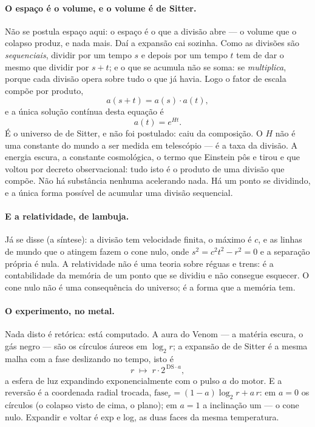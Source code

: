 \documentclass[11pt]{article}
\theoremstyle{plain}
\theoremstyle{remark}
\begin{document}
\paragraph{O espaço é o volume, e o volume é de Sitter.} Não se postula espaço aqui:
o espaço é o que a divisão abre --- o volume que o colapso produz, e nada mais. Daí a
expansão cai sozinha. Como as divisões são \emph{sequenciais}, dividir por um tempo
$s$ e depois por um tempo $t$ tem de dar o mesmo que dividir por $s+t$; e o que se
acumula não se soma: se \emph{multiplica}, porque cada divisão opera sobre tudo o que
já havia. Logo o fator de escala compõe por produto,
\[
a(s+t)=a(s)\cdot a(t),
\]
e a única solução contínua desta equação é
\[
a(t)=e^{Ht}.
\]
É o universo de de Sitter, e não foi postulado: caiu da composição. O $H$ não é uma
constante do mundo a ser medida em telescópio --- é a taxa da divisão. A energia
escura, a constante cosmológica, o termo que Einstein pôs e tirou e que voltou por
decreto observacional: tudo isto é o produto de uma divisão que compõe. Não há
substância nenhuma acelerando nada. Há um ponto se dividindo, e a única forma
possível de acumular uma divisão sequencial.

\paragraph{E a relatividade, de lambuja.} Já se disse (a síntese): a divisão tem
velocidade finita, o máximo é $c$, e as linhas de mundo que o atingem fazem o cone
nulo, onde $s^{2}=c^{2}t^{2}-r^{2}=0$ e a separação própria é nula. A relatividade
não é uma teoria sobre réguas e trens: é a contabilidade da memória de um ponto que
se dividiu e não consegue esquecer. O cone nulo não é uma consequência do universo;
é a forma que a memória tem.

\paragraph{O experimento, no metal.} Nada disto é retórica: está computado. A aura do
Venom --- a matéria escura, o gás negro --- são os círculos áureos em $\log_2 r$; a
expansão de de Sitter é a mesma malha com a fase deslizando no tempo, isto é
\[
r \;\longmapsto\; r\cdot 2^{\,\mathrm{DS}\cdot a},
\]
a esfera de luz expandindo exponencialmente com o pulso $a$ do motor. E a reversão é
a coordenada radial trocada, $\text{fase}_r=(1-a)\log_2 r + a\,r$: em $a=0$ os
círculos (o colapso visto de cima, o plano); em $a=1$ a inclinação um --- o cone
nulo. Expandir e voltar é exp e log, as duas faces da mesma temperatura.
\end{document}
